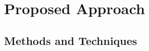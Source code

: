 \chapter{Proposed Approach}

\ifpdf
    \graphicspath{{Chapter3/Figs/Raster/}{Chapter3/Figs/PDF/}{Chapter3/Figs/}}
\else
    \graphicspath{{Chapter3/Figs/Vector/}{Chapter3/Figs/}}
\fi

\section{Methods and Techniques}